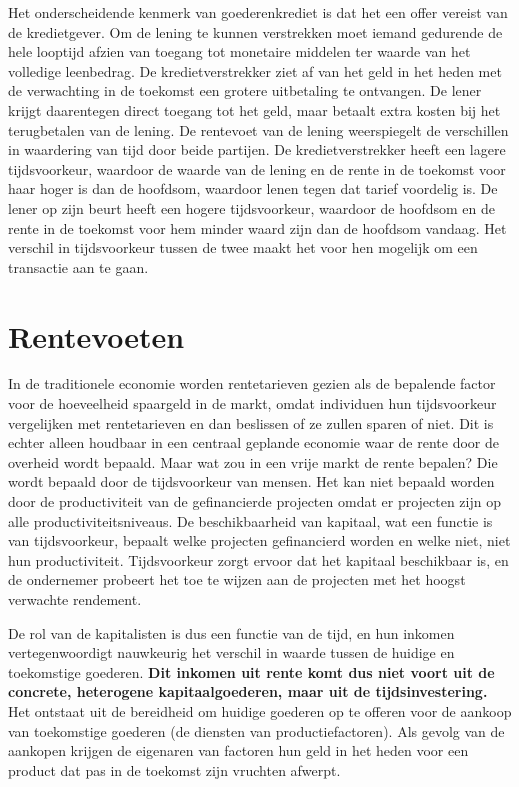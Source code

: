 Het onderscheidende kenmerk van goederenkrediet is dat het een offer vereist van de kredietgever. Om de lening te kunnen verstrekken moet iemand gedurende de hele looptijd afzien van toegang tot monetaire middelen ter waarde van het volledige leenbedrag. De kredietverstrekker ziet af van het geld in het heden met de verwachting in de toekomst een grotere uitbetaling te ontvangen. De lener krijgt daarentegen direct toegang tot het geld, maar betaalt extra kosten bij het terugbetalen van de lening. De rentevoet van de lening weerspiegelt de verschillen in waardering van tijd door beide partijen. De kredietverstrekker heeft een lagere tijdsvoorkeur, waardoor de waarde van de lening en de rente in de toekomst voor haar hoger is dan de hoofdsom, waardoor lenen tegen dat tarief voordelig is. De lener op zijn beurt heeft een hogere tijdsvoorkeur, waardoor de hoofdsom en de rente in de toekomst voor hem minder waard zijn dan de hoofdsom vandaag. Het verschil in tijdsvoorkeur tussen de twee maakt het voor hen mogelijk om een transactie aan te gaan.

\hypertarget{rentevoeten}{%
\section{Rentevoeten}\label{rentevoeten}}

In de traditionele economie worden rentetarieven gezien als de bepalende factor voor de hoeveelheid spaargeld in de markt, omdat individuen hun tijdsvoorkeur vergelijken met rentetarieven en dan beslissen of ze zullen sparen of niet. Dit is echter alleen houdbaar in een centraal geplande economie waar de rente door de overheid wordt bepaald. Maar wat zou in een vrije markt de rente bepalen? Die wordt bepaald door de tijdsvoorkeur van mensen. Het kan niet bepaald worden door de productiviteit van de gefinancierde projecten omdat er projecten zijn op alle productiviteitsniveaus. De beschikbaarheid van kapitaal, wat een functie is van tijdsvoorkeur, bepaalt welke projecten gefinancierd worden en welke niet, niet hun productiviteit. Tijdsvoorkeur zorgt ervoor dat het kapitaal beschikbaar is, en de ondernemer probeert het toe te wijzen aan de projecten met het hoogst verwachte rendement.

\begin{blockquotebox}
De rol van de kapitalisten is dus een functie van de tijd, en hun inkomen vertegenwoordigt nauwkeurig het verschil in waarde tussen de huidige en toekomstige goederen. \textbf{Dit inkomen uit rente komt dus niet voort uit de concrete, heterogene kapitaalgoederen, maar uit de tijdsinvestering.} Het ontstaat uit de bereidheid om huidige goederen op te offeren voor de aankoop van toekomstige goederen (de diensten van productiefactoren). Als gevolg van de aankopen krijgen de eigenaren van factoren hun geld in het heden voor een product dat pas in de toekomst zijn vruchten afwerpt.\footnotemark
\end{blockquotebox}


